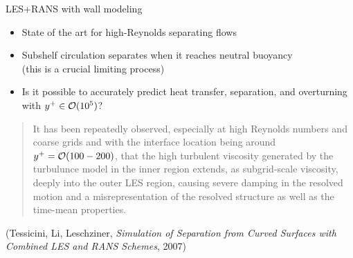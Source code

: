 \begin{frame}{LES+RANS with wall modeling}
  \begin{itemize}
  \item State of the art for high-Reynolds separating flows
  \item Subshelf circulation separates when it reaches neutral buoyancy \\ (this is a crucial limiting process)
  \item Is it possible to accurately predict heat transfer, separation, and overturning with $y^+ \in \mathcal{O}(10^5)$?
  \end{itemize}
  \begin{quotation}
    It has been repeatedly observed, especially at high Reynolds     numbers and coarse grids and with the interface location being around     $y^+ = \mathcal{O}(100-200)$, that the high turbulent viscosity generated by     the turbulunce model in the inner region extends, as subgrid-scale     viscosity, deeply into the outer LES region, causing severe damping in     the resolved motion and a misrepresentation of the resolved structure as     well as the time-mean properties.
  \end{quotation}
  (Tessicini, Li, Leschziner, \emph{Simulation of Separation from Curved Surfaces with Combined LES and RANS Schemes}, 2007)
\end{frame}